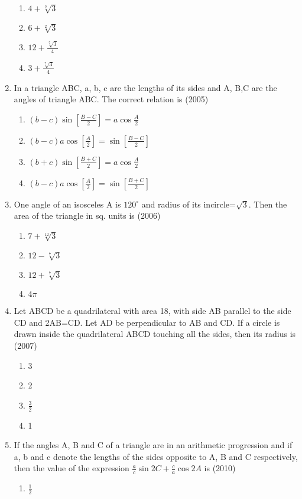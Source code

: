 \documentclass[12pt]{article}
\providecommand{\sbrak}[1]{\ensuremath{{}\left[#1\right]}}
\begin{document}
\begin{enumerate}
\begin{enumerate}
\item $4+\sqrt[2]{3}$
\item $6+\sqrt[2]{3}$
\item $12+\frac{\sqrt[7]{3}}{4}$
\item $3+\frac{\sqrt[7]{3}}{4}$
\end{enumerate}
\item In a triangle ABC, a, b, c are the lengths of its sides and A, B,C are the angles of triangle ABC. The correct relation is  (2005)
\begin{enumerate}
\item  $(b-c)\sin\sbrak{\frac{B-C}{2}}=a\cos\frac{A}{2}$
\item  $(b-c)a\cos\sbrak{\frac{A}{2}}=\sin\sbrak{\frac{B-C}{2}}$
\item  $(b+c)\sin\sbrak{\frac{B+C}{2}}=a\cos\frac{A}{2}$
\item  $(b-c)a\cos\sbrak{\frac{A}{2}}=\sin\sbrak{\frac{B+C}{2}}$
\end{enumerate}
\item One angle of an isosceles A is $120^\circ$ and radius of its incircle=$\sqrt{3}$. Then the area of the triangle in sq. units is (2006)
\begin{enumerate}
\item $7+\sqrt[12]{3}$
\item $12-\sqrt[7]{3}$
\item $12+\sqrt[7]{3}$
\item $4\pi$
\end{enumerate}
\item Let ABCD be a quadrilateral with area 18, with side AB parallel to the side CD and 2AB=CD. Let AD be perpendicular to AB and CD. If a circle is drawn inside the quadrilateral ABCD touching all the sides, then its radius is (2007)
\begin{enumerate}
\item 3
\item 2
\item $\frac{3}{2}$
\item 1
\end{enumerate}
\item If the angles A, B and C of a triangle are in an arithmetic progression and if a, b and c denote the lengths of the sides opposite to A, B and C respectively, then the value of the expression $\frac{a}{c}\sin 2C+\frac{c}{a}\cos 2A$ is (2010)
\begin{enumerate}
\item $\frac{1}{2}$

\end{enumerate}
\end{enumerate}
\end{document}
